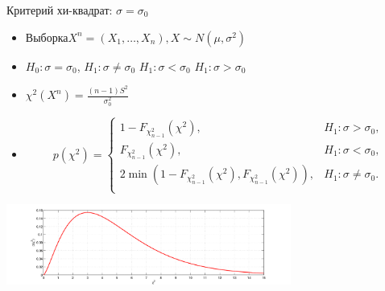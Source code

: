 \documentclass[11pt,pdf,utf8,hyperref={unicode},aspectratio=169]{beamer}
\begin{document}
\begin{frame}[label=chitest1]{\hyperlink{onesample}{} Критерий хи-квадрат: $\sigma=\sigma_0$}

\begin{itemize}
    \item Выборка$X^n=\left(X_1,\ldots,X_n\right), X\sim N\left(\mu, \sigma^2\right)$
    \item $H_0\colon \sigma=\sigma_0$,
    \qquad
    $H_1\colon \sigma \neq \sigma_0$
    \quad
    $H_1\colon \sigma < \sigma_0$
    \quad
    $H_1\colon \sigma  > \sigma_0$

    \item {}\qquad
    \alert{$\displaystyle \chi^2\left(X^n\right) = \frac{(n-1)S^2}{\sigma_0^2}$}
    \item {}
     $$p\left(\chi^2\right) = \begin{cases}
        1-F_{\chi^2_{n-1}}(\chi^2), 																  & H_1 \colon \sigma>\sigma_0, \\
        F_{\chi^2_{n-1}}(\chi^2),    																   & H_1 \colon \sigma<\sigma_0, \\
        2 \min\left( 1-F_{\chi^2_{n-1}}(\chi^2), F_{\chi^2_{n-1}}(\chi^2) \right),  & H_1 \colon \sigma\neq\sigma_0. \\
    \end{cases}$$
  \end{itemize}
  \centering
    \includegraphics[width=0.7\textwidth]{chi2.png}

\end{frame}
\end{document}
